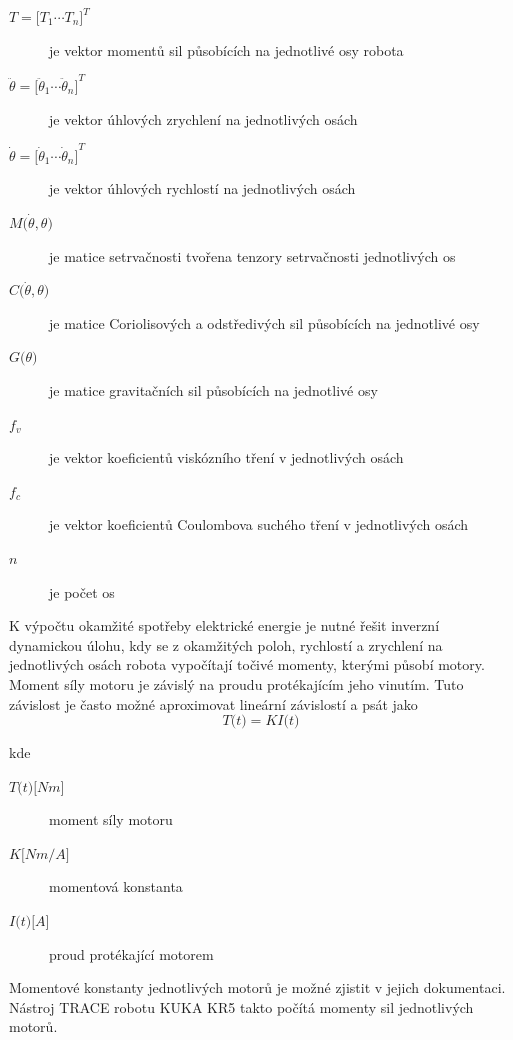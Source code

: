 \begin{description}
\item[$T = {\big[T_1  \dotsm  T_n\big]}^{T}$] je vektor momentů sil působících na jednotlivé osy robota
\item[$\ddot \theta = {\big[\ddot \theta_1  \dotsm  \ddot \theta_n\big]}^{T}$] je vektor úhlových zrychlení na jednotlivých osách
\item[$\dot \theta = {\big[\dot \theta_1  \dotsm  \dot \theta_n\big]}^{T}$] je vektor úhlových rychlostí na jednotlivých osách
\item[$M\big(\dot \theta, \theta\big)$] je matice setrvačnosti tvořena tenzory setrvačnosti jednotlivých os
\item[$C\big(\dot \theta, \theta\big)$] je matice Coriolisových a odstředivých sil působících na jednotlivé osy
\item[$G\big(\theta\big)$] je matice gravitačních sil působících na jednotlivé osy
\item[$f_v$] je vektor koeficientů viskózního tření v jednotlivých osách
\item[$f_c$] je vektor koeficientů Coulombova suchého tření v jednotlivých osách
\item[$n$] je počet os
\end{description}

K výpočtu okamžité spotřeby elektrické energie je nutné řešit inverzní dynamickou úlohu, kdy se z okamžitých poloh, rychlostí a zrychlení na jednotlivých osách robota vypočítají točivé momenty, kterými působí motory. Moment síly motoru je závislý na proudu protékajícím jeho vinutím. Tuto závislost je často možné aproximovat lineární závislostí a psát jako
\begin{equation}
T\big(t\big) = KI\big(t\big)
\label{torque_current_eq}
\end{equation}

kde

\begin{description}
\item[$T\big(t\big) {\big[Nm\big]}$] moment síly motoru 
\item[$K {\big[Nm/A\big]}$] momentová konstanta 
\item[$I\big(t\big) {\big[A\big]}$] proud protékající motorem 
\end{description}

Momentové konstanty jednotlivých motorů je možné zjistit v jejich dokumentaci. Nástroj TRACE robotu KUKA KR5 takto počítá momenty sil jednotlivých motorů. 

